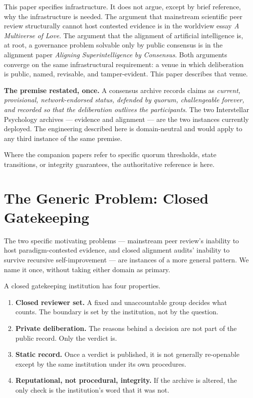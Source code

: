 \documentclass[11pt,a4paper]{article}
\begin{document}
This paper specifies infrastructure. It does not argue, except by
brief reference, why the infrastructure is needed. The argument
that mainstream scientific peer review structurally cannot host
contested evidence is in the worldview essay \emph{A Multiverse
of Love}. The argument that the alignment of artificial
intelligence is, at root, a governance problem solvable only by
public consensus is in the alignment paper \emph{Aligning
Superintelligence by Consensus}. Both arguments converge on the
same infrastructural requirement: a venue in which deliberation
is public, named, revisable, and tamper-evident. This paper
describes that venue.

\begin{notebox}
\textbf{The premise restated, once.}
A consensus archive records claims as \emph{current, provisional,
network-endorsed status, defended by quorum, challengeable
forever, and recorded so that the deliberation outlives the
participants}. The two Interstellar Psychology archives ---
evidence and alignment --- are the two instances currently
deployed. The engineering described here is domain-neutral and
would apply to any third instance of the same premise.
\end{notebox}

Where the companion papers refer to specific quorum thresholds,
state transitions, or integrity guarantees, the authoritative
reference is here.

\section{The Generic Problem: Closed Gatekeeping}

The two specific motivating problems --- mainstream peer review's
inability to host paradigm-contested evidence, and closed
alignment audits' inability to survive recursive self-improvement
--- are instances of a more general pattern. We name it once,
without taking either domain as primary.

A closed gatekeeping institution has four properties.

\begin{enumerate}[leftmargin=1.5em]
  \item \textbf{Closed reviewer set.} A fixed and unaccountable
        group decides what counts. The boundary is set by the
        institution, not by the question.
  \item \textbf{Private deliberation.} The reasons behind a
        decision are not part of the public record. Only the
        verdict is.
  \item \textbf{Static record.} Once a verdict is published, it
        is not generally re-openable except by the same
        institution under its own procedures.
  \item \textbf{Reputational, not procedural, integrity.} If the
        archive is altered, the only check is the institution's
        word that it was not.
\end{enumerate}
\end{document}
